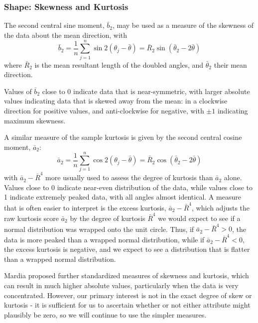 \documentclass[../../ArchStats.tex]{subfiles}
\begin{document}


\subsubsection{Shape: Skewness and Kurtosis}
\label{sec:shape}

The second central sine moment, $\bar{b}_2$, may be used as a measure of the skewness of the data about the mean direction, with
\[ \bar{b}_2 = \frac{1}{n} \sum_{j=1}^n \sin 2(\theta_j-\bar{\theta}) = \bar{R}_2 \sin(\bar{\theta}_2 - 2\bar{\theta}) \]
where $\bar{R}_2$ is the mean resultant length of the doubled angles, and $\bar{\theta}_2$ their mean direction. 

Values of $\bar{b}_2$ close to 0 indicate data that is near-symmetric, with larger  absolute values indicating data that is skewed away from the mean: in a clockwise direction for positive values, and anti-clockwise for negative, with $\pm1$ indicating maximum skewness.

A similar measure of the sample kurtosis is given by the second central cosine moment, $\bar{a}_2$:
\[ \bar{a}_2 = \frac{1}{n} \sum_{j=1}^n \cos 2(\theta_j-\bar{\theta}) = \bar{R}_2 \cos(\bar{\theta}_2 - 2\bar{\theta}) \]
 with $\bar{a}_2 - \bar{R}^4$ more usually used to assess the degree of kurtosis than $\bar{a}_2$ alone. 
Values close to 0 indicate near-even distribution of the data, while values close to 1 indicate extremely peaked data, with all angles almost identical. A measure that is often easier to interpret is the excess kurtosis, $\bar{a}_2 - \bar{R}^4$, which adjusts the raw kurtosis score $\bar{a}_2$ by the degree of kurtosis $\bar{R}^4$ we would expect to see if a normal distribution was wrapped onto the unit circle. Thus, if $\bar{a}_2 - \bar{R}^4 > 0$, the data is more peaked than a wrapped normal distribution, while if $\bar{a}_2 - \bar{R}^4 < 0$, the excess kurtosis is negative, and we expect to see a distribution that is flatter than a wrapped normal distribution.

Mardia \cite{Mardia1972} proposed further standardized measures of skewness and kurtosis, which can result in much higher absolute values, particularly when the data is very concentrated. However, our primary interest is not in the exact degree of skew or kurtosis - it is sufficient for us to ascertain whether or not either attribute might plausibly be zero, so we will continue to use the simpler measures.
\end{document}
